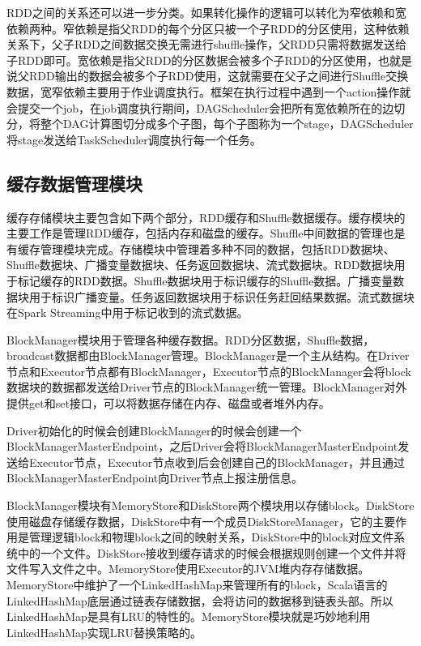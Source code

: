 RDD之间的关系还可以进一步分类。如果转化操作的逻辑可以转化为窄依赖和宽依赖两种。窄依赖是指父RDD的每个分区只被一个子RDD的分区使用，这种依赖关系下，父子RDD之间数据交换无需进行shuffle操作，父RDD只需将数据发送给子RDD即可。宽依赖是指父RDD的分区数据会被多个子RDD的分区使用，也就是说父RDD输出的数据会被多个子RDD使用，这就需要在父子之间进行Shuffle交换数据，宽窄依赖主要用于作业调度执行。框架在执行过程中遇到一个action操作就会提交一个job，在job调度执行期间，DAGScheduler会把所有宽依赖所在的边切分，将整个DAG计算图切分成多个子图，每个子图称为一个stage，DAGScheduler将stage发送给TaskScheduler调度执行每一个任务。





\subsection{缓存数据管理模块}

缓存存储模块主要包含如下两个部分，RDD缓存和Shuffle数据缓存。缓存模块的主要工作是管理RDD缓存，包括内存和磁盘的缓存。Shuffle中间数据的管理也是有缓存管理模块完成。存储模块中管理着多种不同的数据，包括RDD数据块、Shuffle数据块、广播变量数据块、任务返回数据块、流式数据块。RDD数据块用于标记缓存的RDD数据。Shuffle数据块用于标识缓存的Shuffle数据。广播变量数据块用于标识广播变量。任务返回数据块用于标识任务赶回结果数据。流式数据块在Spark Streaming中用于标记收到的流式数据。

BlockManager模块用于管理各种缓存数据。RDD分区数据，Shuffle数据，broadcast数据都由BlockManager管理。BlockManager是一个主从结构。在Driver节点和Executor节点都有BlockManager，Executor节点的BlockManager会将block数据块的数据都发送给Driver节点的BlockManager统一管理。BlockManager对外提供get和set接口，可以将数据存储在内存、磁盘或者堆外内存。

Driver初始化的时候会创建BlockManager的时候会创建一个BlockManagerMasterEndpoint，之后Driver会将BlockManagerMasterEndpoint发送给Executor节点，Executor节点收到后会创建自己的BlockManager，并且通过BlockManagerMasterEndpoint向Driver节点上报注册信息。


BlockManager模块有MemoryStore和DiskStore两个模块用以存储block。DiskStore使用磁盘存储缓存数据，DiskStore中有一个成员DiskStoreManager，它的主要作用是管理逻辑block和物理block之间的映射关系，DiskStore中的block对应文件系统中的一个文件。DiskStore接收到缓存请求的时候会根据规则创建一个文件并将文件写入文件之中。MemoryStore使用Executor的JVM堆内存存储数据。MemoryStore中维护了一个LinkedHashMap来管理所有的block，Scala语言的LinkedHashMap底层通过链表存储数据，会将访问的数据移到链表头部。所以LinkedHashMap是具有LRU的特性的。MemoryStore模块就是巧妙地利用LinkedHashMap实现LRU替换策略的。

